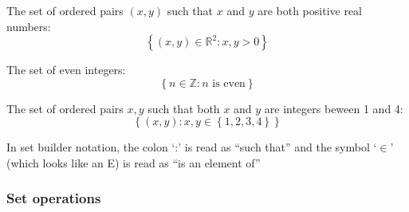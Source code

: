 \documentclass[10pt]{article}
\theoremstyle{definition}
\newcommand{\1}[1]{\textbf{1}_{\left[#1\right]}} %
\def\R{\mathbb{R}} %
\begin{document}
\begin{itemize}
  The set of ordered pairs $(x,y)$ such that $x$ and $y$ are both positive
  real numbers:
  \begin{equation*}
    \left\{(x,y)\in \R^{2}: x,y>0\right\}
  \end{equation*}
  

  The set of even integers:
  \begin{equation*}
    \left\{n\in \mathbb{Z}: n \text{ is even}\right\} 
  \end{equation*}
  
  The set of ordered pairs $x,y$ such that both $x$ and $y$ are integers
  beween 1 and 4:
  \begin{equation*}
    \left\{(x,y): x,y\in \left\{1,2,3,4\right\} \right\} 
  \end{equation*}

  In set builder notation, the colon `:' is read as ``such that'' and the
  symbol `$\in$' (which looks like an E) is read as ``is an element of''
    
\end{itemize}

\subsubsection{Set operations}

\end{document}
